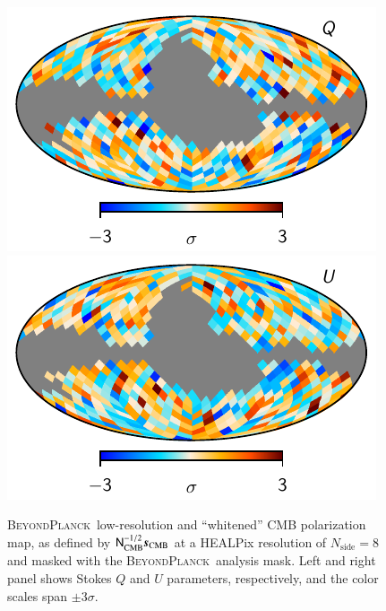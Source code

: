 \documentclass[twocolumn]{aa}
\newcommand{\s}[0]{\vec{s}}
\newcommand{\N}[0]{\tens{N}}
\newcommand{\BP}{\textsc{BeyondPlanck}}
\begin{document}
\begin{figure}[t]
  \center
  \includegraphics[width=0.49\linewidth]{figs/cmb_whitened_BP10_mask_Q.pdf}
  \includegraphics[width=0.49\linewidth]{figs/cmb_whitened_BP10_mask_U.pdf}
  \caption{\BP\ low-resolution and ``whitened'' CMB polarization map,
    as defined by $\N_{\mathrm{CMB}}^{-1/2}\s_{\mathrm{CMB}}$ at a HEALPix
    resolution of $N_{\mathrm{side}}=8$ and masked with the
    \BP\ analysis mask. Left and right panel shows Stokes $Q$ and
    $U$ parameters, respectively, and the color scales span
    $\pm3\sigma$.}\label{fig:whitened}
\end{figure}
\end{document}
